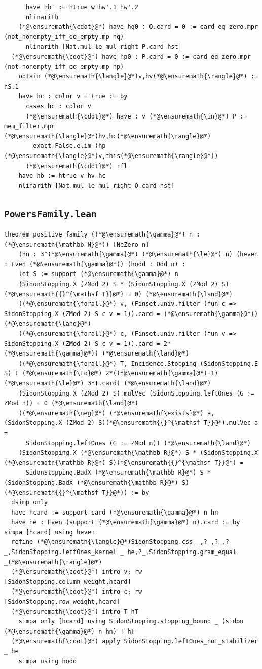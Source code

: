 \begin{lstlisting}
      have hb' := htrue w hw'.1 hw'.2
      nlinarith
    (*@\ensuremath{\cdot}@*) have hq0 : Q.card = 0 := card_eq_zero.mpr (not_nonempty_iff_eq_empty.mp hq)
      nlinarith [Nat.mul_le_mul_right P.card hst]
  (*@\ensuremath{\cdot}@*) have hp0 : P.card = 0 := card_eq_zero.mpr (not_nonempty_iff_eq_empty.mp hp)
    obtain (*@\ensuremath{\langle}@*)v,hv(*@\ensuremath{\rangle}@*) := hS.1
    have hc : color v = true := by
      cases hc : color v
      (*@\ensuremath{\cdot}@*) have : v (*@\ensuremath{\in}@*) P := mem_filter.mpr (*@\ensuremath{\langle}@*)hv,hc(*@\ensuremath{\rangle}@*)
        exact False.elim (hp (*@\ensuremath{\langle}@*)v,this(*@\ensuremath{\rangle}@*))
      (*@\ensuremath{\cdot}@*) rfl
    have hb := htrue v hv hc
    nlinarith [Nat.mul_le_mul_right Q.card hst]
\end{lstlisting}
\subsection*{\texttt{PowersFamily.lean}}
\begin{lstlisting}
theorem positive_family ((*@\ensuremath{\gamma}@*) n : (*@\ensuremath{\mathbb N}@*)) [NeZero n]
    (hn : 3^(*@\ensuremath{\gamma}@*) (*@\ensuremath{\le}@*) n) (heven : Even (*@\ensuremath{\gamma}@*)) (hodd : Odd n) :
    let S := support (*@\ensuremath{\gamma}@*) n
    (SidonStopping.X (ZMod 2) S * (SidonStopping.X (ZMod 2) S)(*@\ensuremath{{}^{\mathsf T}}@*) = 0) (*@\ensuremath{\land}@*)
    ((*@\ensuremath{\forall}@*) v, (Finset.univ.filter (fun c => SidonStopping.X (ZMod 2) S c v = 1)).card = (*@\ensuremath{\gamma}@*)) (*@\ensuremath{\land}@*)
    ((*@\ensuremath{\forall}@*) c, (Finset.univ.filter (fun v => SidonStopping.X (ZMod 2) S c v = 1)).card = 2*(*@\ensuremath{\gamma}@*)) (*@\ensuremath{\land}@*)
    ((*@\ensuremath{\forall}@*) T, Incidence.Stopping (SidonStopping.E S) T (*@\ensuremath{\to}@*) 2*((*@\ensuremath{\gamma}@*)+1) (*@\ensuremath{\le}@*) 3*T.card) (*@\ensuremath{\land}@*)
    (SidonStopping.X (ZMod 2) S).mulVec (SidonStopping.leftOnes (G := ZMod n)) = 0 (*@\ensuremath{\land}@*)
    ((*@\ensuremath{\neg}@*) (*@\ensuremath{\exists}@*) a, (SidonStopping.X (ZMod 2) S)(*@\ensuremath{{}^{\mathsf T}}@*).mulVec a =
      SidonStopping.leftOnes (G := ZMod n)) (*@\ensuremath{\land}@*)
    (SidonStopping.X (*@\ensuremath{\mathbb R}@*) S * (SidonStopping.X (*@\ensuremath{\mathbb R}@*) S)(*@\ensuremath{{}^{\mathsf T}}@*) =
      SidonStopping.BadX (*@\ensuremath{\mathbb R}@*) S * (SidonStopping.BadX (*@\ensuremath{\mathbb R}@*) S)(*@\ensuremath{{}^{\mathsf T}}@*)) := by
  dsimp only
  have hcard := support_card (*@\ensuremath{\gamma}@*) n hn
  have he : Even (support (*@\ensuremath{\gamma}@*) n).card := by simpa [hcard] using heven
  refine (*@\ensuremath{\langle}@*)SidonStopping.css _,?_,?_,?_,SidonStopping.leftOnes_kernel _ he,?_,SidonStopping.gram_equal _(*@\ensuremath{\rangle}@*)
  (*@\ensuremath{\cdot}@*) intro v; rw [SidonStopping.column_weight,hcard]
  (*@\ensuremath{\cdot}@*) intro c; rw [SidonStopping.row_weight,hcard]
  (*@\ensuremath{\cdot}@*) intro T hT
    simpa only [hcard] using SidonStopping.stopping_bound _ (sidon (*@\ensuremath{\gamma}@*) n hn) T hT
  (*@\ensuremath{\cdot}@*) apply SidonStopping.leftOnes_not_stabilizer _ he
    simpa using hodd
\end{lstlisting}

